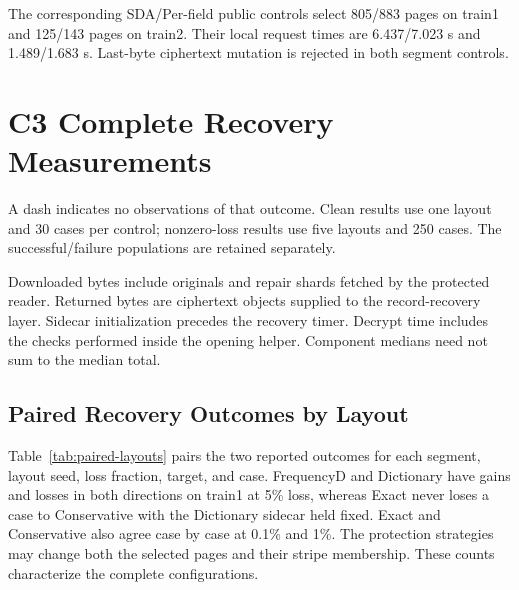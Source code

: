 \documentclass[10pt,journal,onecolumn]{IEEEtran}
\begin{document}




The corresponding SDA/Per-field public controls select 805/883 pages on train1 and 125/143 pages on train2. Their local request times are 6.437/7.023 s and 1.489/1.683 s. Last-byte ciphertext mutation is rejected in both segment controls.

\section{C3 Complete Recovery Measurements}





A dash indicates no observations of that outcome. Clean results use one layout and 30 cases per control; nonzero-loss results use five layouts and 250 cases. The successful/failure populations are retained separately.



Downloaded bytes include originals and repair shards fetched by the protected reader. Returned bytes are ciphertext objects supplied to the record-recovery layer. Sidecar initialization precedes the recovery timer. Decrypt time includes the checks performed inside the opening helper. Component medians need not sum to the median total.

\subsection{Paired Recovery Outcomes by Layout}
Table~\ref{tab:paired-layouts} pairs the two reported outcomes for each
segment, layout seed, loss fraction, target, and case. FrequencyD and
Dictionary have gains and losses in both directions on train1 at 5\% loss,
whereas Exact never loses a case to Conservative with the Dictionary sidecar
held fixed. Exact and Conservative also agree case by case at 0.1\% and 1\%.
The protection strategies may change both the selected pages and their
stripe membership. These counts characterize the complete configurations.
\end{document}
